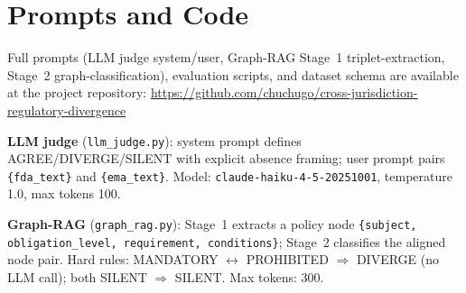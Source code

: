\documentclass[manuscript]{acmart}
\begin{document}



\appendix

\section{Prompts and Code}
\label{app:prompt}

Full prompts (LLM judge system/user, Graph-RAG Stage~1 triplet-extraction,
Stage~2 graph-classification), evaluation scripts, and dataset schema are
available at the project repository:
\url{https://github.com/chuchugo/cross-jurisdiction-regulatory-divergence}

\noindent\textbf{LLM judge} (\texttt{llm\_judge.py}): system prompt defines
AGREE/DIVERGE/SILENT with explicit absence framing; user prompt pairs
\texttt{\{fda\_text\}} and \texttt{\{ema\_text\}}.
Model: \texttt{claude-haiku-4-5-20251001}, temperature 1.0, max tokens 100.

\noindent\textbf{Graph-RAG} (\texttt{graph\_rag.py}): Stage~1 extracts a
policy node \texttt{\{subject, obligation\_level, requirement, conditions\}};
Stage~2 classifies the aligned node pair. Hard rules: MANDATORY
$\leftrightarrow$ PROHIBITED $\Rightarrow$ DIVERGE (no LLM call); both
SILENT $\Rightarrow$ SILENT. Max tokens: 300.
\end{document}
